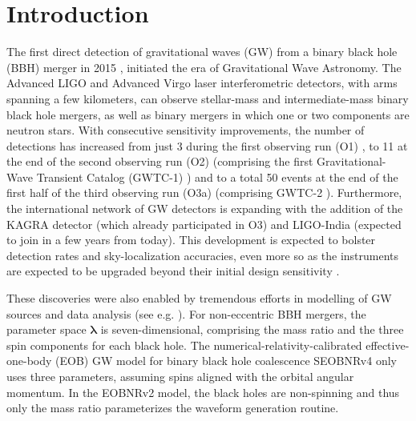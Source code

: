 \documentclass[preprint,12pt]{elsarticle}
\begin{document}

\section{Introduction}
\label{sec:introduction}


The first direct detection of gravitational waves (GW) from a binary black hole (BBH) merger in 2015 \cite{Abbott:2016blz}, initiated the era of Gravitational Wave Astronomy. The Advanced LIGO \cite{TheLIGOScientific:2014jea} and Advanced Virgo \cite{acernese2014advanced} laser interferometric detectors, with arms spanning a few kilometers, can observe stellar-mass and intermediate-mass binary black hole mergers, as well as binary mergers in which one or two components are neutron stars. With consecutive sensitivity improvements, the number of detections has increased from just 3 during the first observing run (O1) \cite{TheLIGOScientific:2016pea}, to 11 at the end of the second observing run (O2) (comprising the first Gravitational-Wave Transient Catalog (GWTC-1) \cite{LIGOScientific:2018mvr}) and to a total 50 events at the end of the first half of the third observing run (O3a) (comprising GWTC-2 \cite{Abbott:2020niy}). 
Furthermore, the international network of GW detectors is expanding with the addition of the KAGRA detector \cite{akutsu2019kagra} (which already participated in O3) and LIGO-India \cite{2021arXiv210501716S} (expected to join in a few years from today). This development is expected to bolster detection rates and  sky-localization accuracies, even more so as the instruments are expected to be upgraded beyond their initial design sensitivity \cite{abbott2020prospects}.


These discoveries were also enabled by tremendous efforts in modelling of GW sources and data analysis (see e.g. \cite{mehta2017, mehta2019, khan2020, estelles2020, cotesta2018, nagar2018, nagar2020, rifat2020, varma2019, khan2019phenom, varma2019precess, williams2020, ossokine2020, dietrich2019tidal, dietrich2019improved, pratten2020domharm, london2018, nagar2020teob, pratten2021IMRPhenomXPHM, garciaquiros2020,LIGOScientific:2020stg, Abbott:2020khf}). 
For non-eccentric BBH mergers, the parameter space $\boldsymbol{\lambda}$ is seven-dimensional, comprising the mass ratio and the three spin components for each black hole. The  numerical-relativity-calibrated effective-one-body (EOB) GW model for binary black hole coalescence
SEOBNRv4 \cite{bohe2017improved} only uses three parameters, assuming spins aligned with the orbital angular momentum. In the EOBNRv2 \cite{pan2011inspiral} model, the black holes are non-spinning and thus only the mass ratio parameterizes the waveform generation routine.
\end{document}
